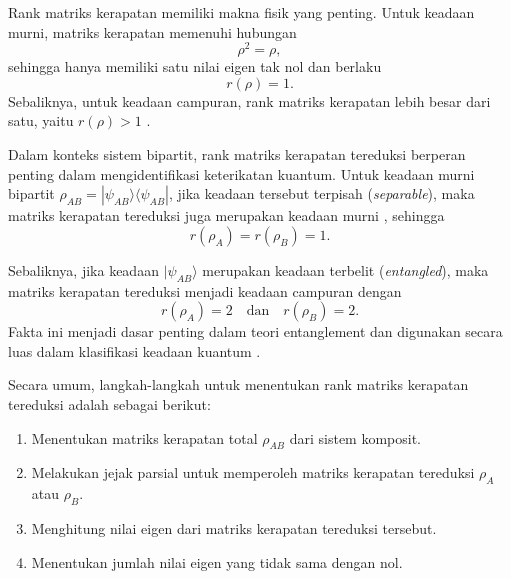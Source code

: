 Rank matriks kerapatan memiliki makna fisik yang penting. Untuk keadaan murni, matriks kerapatan memenuhi hubungan
\begin{equation}
\rho^2 = \rho,
\end{equation}
sehingga hanya memiliki satu nilai eigen tak nol dan berlaku
\begin{equation}
r(\rho) = 1.
\end{equation}
Sebaliknya, untuk keadaan campuran, rank matriks kerapatan lebih besar dari satu, yaitu $r(\rho) > 1$ \cite{nielsen2010quantum}.
\par
Dalam konteks sistem bipartit, rank matriks kerapatan tereduksi berperan penting dalam mengidentifikasi keterikatan kuantum. Untuk keadaan murni bipartit $\rho_{AB} = |\psi_{AB}\rangle\langle\psi_{AB}|$, jika keadaan tersebut terpisah (\textit{separable}), maka matriks kerapatan tereduksi juga merupakan keadaan murni \cite{Purwanto2018}, sehingga
\begin{equation}
r(\rho_A) = r(\rho_B) = 1.
\end{equation}

Sebaliknya, jika keadaan $|\psi_{AB}\rangle$ merupakan keadaan terbelit (\textit{entangled}), maka matriks kerapatan tereduksi menjadi keadaan campuran dengan
\begin{equation}
r(\rho_A) = 2 \quad \text{dan} \quad r(\rho_B) = 2.
\end{equation}
Fakta ini menjadi dasar penting dalam teori entanglement dan digunakan secara luas dalam klasifikasi keadaan kuantum \cite{horodecki1996separability,terhal2000schmidt}.
\par
Secara umum, langkah-langkah untuk menentukan rank matriks kerapatan tereduksi adalah sebagai berikut:
\begin{enumerate}
    \item Menentukan matriks kerapatan total $\rho_{AB}$ dari sistem komposit.
    \item Melakukan jejak parsial untuk memperoleh matriks kerapatan tereduksi $\rho_A$ atau $\rho_B$.
    \item Menghitung nilai eigen dari matriks kerapatan tereduksi tersebut.
    \item Menentukan jumlah nilai eigen yang tidak sama dengan nol.
\end{enumerate}

